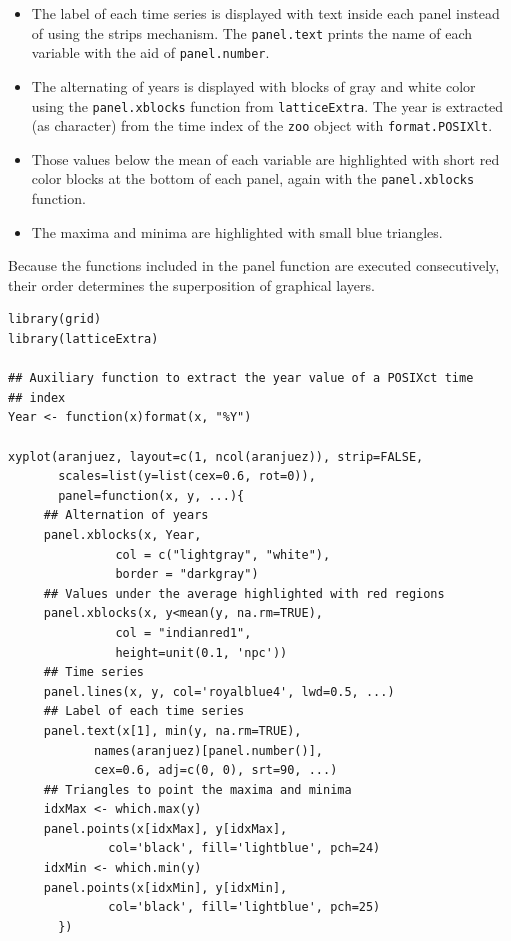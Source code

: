 \begin{itemize}
\item The label of each time series is displayed with text inside each
panel instead of using the strips mechanism. The \texttt{panel.text}
prints the name of each variable with the aid of \texttt{panel.number}.
\item The alternating of years is displayed with blocks of gray and
white color using the \texttt{panel.xblocks} function from
\texttt{latticeExtra}. The year is extracted (as character) from the
time index of the \texttt{zoo} object with \texttt{format.POSIXlt}.
\item Those values below the mean of each variable are highlighted
with short red color blocks at the bottom of each panel, again
with the \texttt{panel.xblocks} function.
\item The maxima and minima are highlighted with small blue triangles.
\end{itemize}

Because the functions included in the panel function are executed
consecutively, their order determines the superposition of graphical
layers.

\lstset{language=R,numbers=none}
\begin{lstlisting}
library(grid)
library(latticeExtra)

## Auxiliary function to extract the year value of a POSIXct time
## index
Year <- function(x)format(x, "%Y")

xyplot(aranjuez, layout=c(1, ncol(aranjuez)), strip=FALSE,
       scales=list(y=list(cex=0.6, rot=0)),
       panel=function(x, y, ...){
	 ## Alternation of years
	 panel.xblocks(x, Year,
		       col = c("lightgray", "white"),
		       border = "darkgray")
	 ## Values under the average highlighted with red regions
	 panel.xblocks(x, y<mean(y, na.rm=TRUE),
		       col = "indianred1",
		       height=unit(0.1, 'npc'))
	 ## Time series
	 panel.lines(x, y, col='royalblue4', lwd=0.5, ...)
	 ## Label of each time series
	 panel.text(x[1], min(y, na.rm=TRUE),
		    names(aranjuez)[panel.number()],
		    cex=0.6, adj=c(0, 0), srt=90, ...)
	 ## Triangles to point the maxima and minima 
	 idxMax <- which.max(y)
	 panel.points(x[idxMax], y[idxMax],
		      col='black', fill='lightblue', pch=24)
	 idxMin <- which.min(y)
	 panel.points(x[idxMin], y[idxMin],
		      col='black', fill='lightblue', pch=25)
       })
\end{lstlisting}

